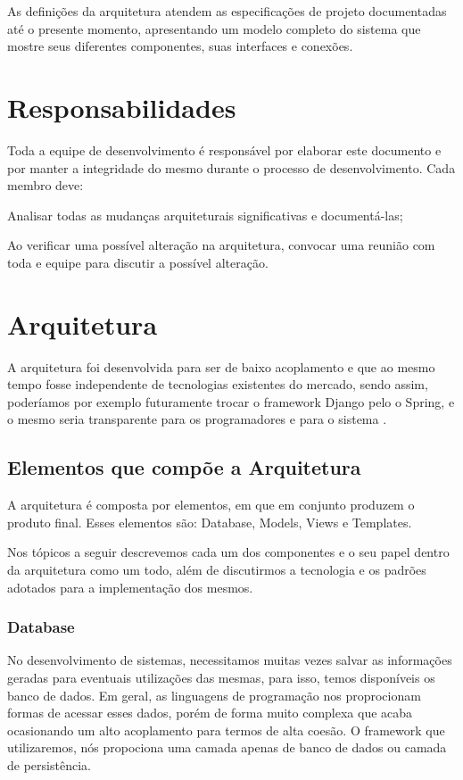 As definições da arquitetura atendem as especificações de projeto documentadas 
até o presente momento, apresentando um modelo completo do sistema que mostre 
seus diferentes componentes, suas interfaces e conexões.

\section{Responsabilidades}
Toda a equipe de desenvolvimento é responsável por elaborar este documento  e 
por manter a integridade do mesmo durante o processo de desenvolvimento. Cada 
membro deve:
\begin{alineascomponto}
	\item Analisar todas as mudanças arquiteturais significativas e 
documentá-las;
    \item Ao verificar uma possível alteração na arquitetura, convocar uma 
reunião com toda e equipe para discutir a possível alteração. 
\end{alineascomponto}

\section{Arquitetura}
A arquitetura foi desenvolvida para ser de baixo acoplamento e que ao mesmo 
tempo fosse independente de tecnologias existentes do mercado, sendo assim, 
poderíamos por exemplo futuramente trocar o framework Django pelo o Spring, e o 
mesmo seria transparente para os programadores e para o sistema .

\subsection{Elementos que compõe a Arquitetura}
A arquitetura é composta por elementos, em que em conjunto produzem o produto 
final. Esses elementos são: Database, Models, Views e Templates.

Nos tópicos a seguir descrevemos cada um dos componentes e o seu papel  dentro 
da arquitetura como um todo, além de discutirmos a tecnologia e os padrões 
adotados para a implementação dos mesmos.

\subsubsection{Database}
No desenvolvimento de sistemas, necessitamos muitas vezes salvar as informações 
geradas para eventuais utilizações das mesmas, para isso, temos disponíveis os 
banco de dados. Em geral, as linguagens de programação nos proprocionam formas 
de acessar esses dados, porém de forma muito  complexa que acaba ocasionando um 
alto acoplamento para termos de alta coesão. O framework que utilizaremos, nós 
propociona uma camada apenas de banco de dados ou camada de persistência.

